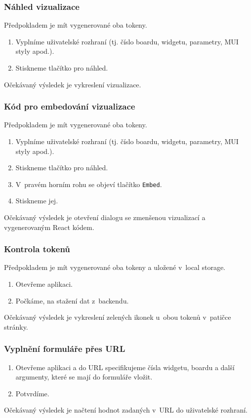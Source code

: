 \documentclass[czech, bc, kiv, he, iso690numb, viewonly]{fasthesis} %
\begin{document}
\subsubsection{Náhled vizualizace}
Předpokladem je mít vygenerované oba tokeny.
\begin{enumerate}
	\item Vyplníme uživatelské rozhraní (tj. číslo boardu, widgetu, parametry, MUI styly apod.).
	\item Stiskneme tlačítko pro náhled.
\end{enumerate}
Očekávaný výsledek je vykreslení vizualizace.

\subsubsection{Kód pro embedování vizualizace}
Předpokladem je mít vygenerované oba tokeny.
\begin{enumerate}
	\item Vyplníme uživatelské rozhraní (tj. číslo boardu, widgetu, parametry, MUI styly apod.).
	\item Stiskneme tlačítko pro náhled.
	\item V~pravém horním rohu se objeví tlačítko \texttt{Embed}.
	\item Stiskneme jej.
\end{enumerate}
Očekávaný výsledek je otevření dialogu se zmenšenou vizualizací a vygenerovaným React kódem.

\subsubsection{Kontrola tokenů}
Předpokladem je mít vygenerované oba tokeny a uložené v~local storage.

\begin{enumerate}
	\item Otevřeme aplikaci.
	\item Počkáme, na stažení dat z~backendu.
\end{enumerate}
Očekávaný výsledek je vykreslení zelených ikonek u~obou tokenů v~patičce stránky.

\subsubsection{Vyplnění formuláře přes URL}

\begin{enumerate}
	\item Otevřeme aplikaci a do URL specifikujeme čísla widgetu, boardu a další argumenty, které se mají do formuláře vložit.
	\item Potvrdíme.
\end{enumerate}
Očekávaný výsledek je načtení hodnot zadaných v~URL do uživatelské rozhraní.
\end{document}
